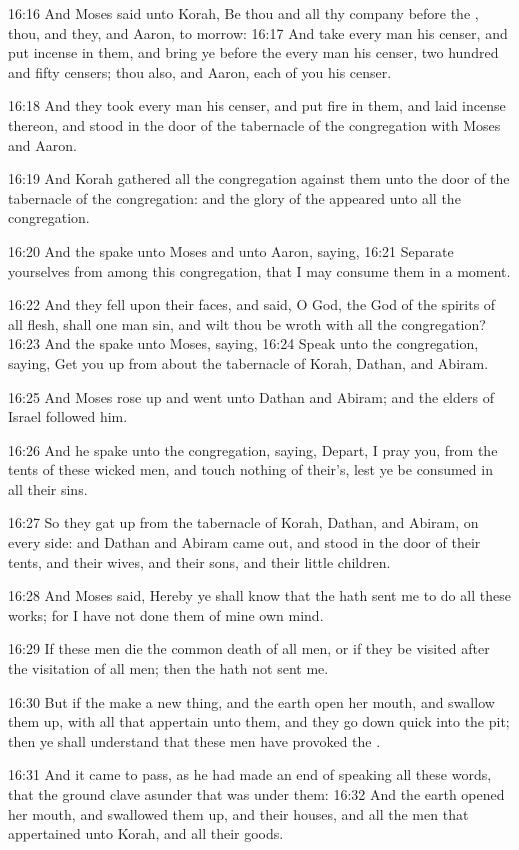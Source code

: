16:16 And Moses said unto Korah, Be thou and all thy company before the \LORD, thou, and they, and Aaron, to morrow: 16:17 And take every man his censer, and put incense in them, and bring ye before the \LORD every man his censer, two hundred and fifty censers; thou also, and Aaron, each of you his censer.

16:18 And they took every man his censer, and put fire in them, and laid incense thereon, and stood in the door of the tabernacle of the congregation with Moses and Aaron.

16:19 And Korah gathered all the congregation against them unto the door of the tabernacle of the congregation: and the glory of the \LORD appeared unto all the congregation.

16:20 And the \LORD spake unto Moses and unto Aaron, saying, 16:21 Separate yourselves from among this congregation, that I may consume them in a moment.

16:22 And they fell upon their faces, and said, O God, the God of the spirits of all flesh, shall one man sin, and wilt thou be wroth with all the congregation?  16:23 And the \LORD spake unto Moses, saying, 16:24 Speak unto the congregation, saying, Get you up from about the tabernacle of Korah, Dathan, and Abiram.

16:25 And Moses rose up and went unto Dathan and Abiram; and the elders of Israel followed him.

16:26 And he spake unto the congregation, saying, Depart, I pray you, from the tents of these wicked men, and touch nothing of their's, lest ye be consumed in all their sins.

16:27 So they gat up from the tabernacle of Korah, Dathan, and Abiram, on every side: and Dathan and Abiram came out, and stood in the door of their tents, and their wives, and their sons, and their little children.

16:28 And Moses said, Hereby ye shall know that the \LORD hath sent me to do all these works; for I have not done them of mine own mind.

16:29 If these men die the common death of all men, or if they be visited after the visitation of all men; then the \LORD hath not sent me.

16:30 But if the \LORD make a new thing, and the earth open her mouth, and swallow them up, with all that appertain unto them, and they go down quick into the pit; then ye shall understand that these men have provoked the \LORD.

16:31 And it came to pass, as he had made an end of speaking all these words, that the ground clave asunder that was under them: 16:32 And the earth opened her mouth, and swallowed them up, and their houses, and all the men that appertained unto Korah, and all their goods.

